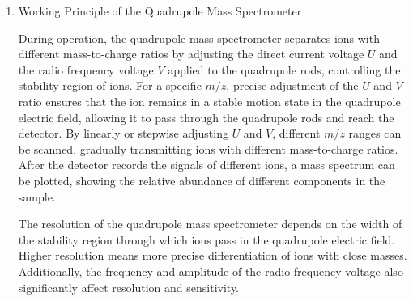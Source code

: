 \begin{enumerate}
\begin{enumerate}
		\[
		\frac{d^2x}{dt^2} + \frac{q}{m} \frac{U + V\cos(\omega t)}{r_0^2} x = 0
		\]
		
		\[
		\frac{d^2y}{dt^2} - \frac{q}{m} \frac{U + V\cos(\omega t)}{r_0^2} y = 0
		\]
		
		By introducing the dimensionless parameters \( a_x \) and \( q_x \), the above differential equations can be normalized to the standard form of the Mathieu equation:
		
		\[
		\frac{d^2u}{d\xi^2} + \left[ a - 2q\cos(2\xi) \right] u = 0
		\]
		
		where \( u \) can represent either \( x \) or \( y \); \( \xi = \frac{\omega t}{2} \) is the normalized time; \( a_x = \frac{4qU}{m r_0^2 \omega^2} \) and \( q_x = \frac{2qV}{m r_0^2 \omega^2} \) are dimensionless parameters.
		
		The solutions of the Mathieu equation can be classified into two categories: stable solutions and unstable solutions. Stable solutions correspond to stable ion motion in the quadrupole electric field, while unstable solutions correspond to ion divergence or ejection from the quadrupole rod system. By analyzing the solutions of the Mathieu equation, one can determine the stability regions for ion motion under specific \( a \) and \( q \) parameters, corresponding to ions with specific mass-to-charge ratios \( m/z \) that can be stably transmitted through the quadrupole rod system. Ions in the unstable regions will be ejected by the alternating electric field and will not reach the detector.
		
		\item Working Principle of the Quadrupole Mass Spectrometer
		
		During operation, the quadrupole mass spectrometer separates ions with different mass-to-charge ratios by adjusting the direct current voltage \( U \) and the radio frequency voltage \( V \) applied to the quadrupole rods, controlling the stability region of ions. For a specific \( m/z \), precise adjustment of the \( U \) and \( V \) ratio ensures that the ion remains in a stable motion state in the quadrupole electric field, allowing it to pass through the quadrupole rods and reach the detector. By linearly or stepwise adjusting \( U \) and \( V \), different \( m/z \) ranges can be scanned, gradually transmitting ions with different mass-to-charge ratios. After the detector records the signals of different ions, a mass spectrum can be plotted, showing the relative abundance of different components in the sample.
		
		The resolution of the quadrupole mass spectrometer depends on the width of the stability region through which ions pass in the quadrupole electric field. Higher resolution means more precise differentiation of ions with close masses. Additionally, the frequency and amplitude of the radio frequency voltage also significantly affect resolution and sensitivity.
	\end{enumerate}		 
\end{enumerate}


